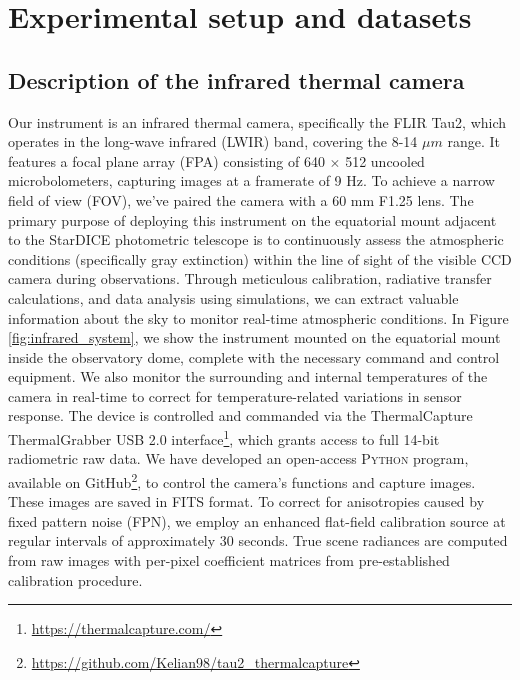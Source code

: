 \documentclass[amt, article]{copernicus}
\begin{document}
\section{Experimental setup and datasets}
\label{sec:setup}

\subsection{Description of the infrared thermal camera}

Our instrument is an infrared thermal camera, specifically the FLIR Tau2, which operates in the long-wave infrared (LWIR) band, covering the 8-14 $\mu m$ range. It features a focal plane array (FPA) consisting of 640 $\times$ 512 uncooled microbolometers, capturing images at a framerate of 9 Hz. To achieve a narrow field of view (FOV), we've paired the camera with a 60 mm F1.25 lens. The primary purpose of deploying this instrument on the equatorial mount adjacent to the StarDICE photometric telescope is to continuously assess the atmospheric conditions (specifically gray extinction) within the line of sight of the visible CCD camera during observations.
Through meticulous calibration, radiative transfer calculations, and data analysis using simulations, we can extract valuable information about the sky to monitor real-time atmospheric conditions. In Figure \ref{fig:infrared_system}, we show the instrument mounted on the equatorial mount inside the observatory dome, complete with the necessary command and control equipment. We also monitor the surrounding and internal temperatures of the camera in real-time to correct for temperature-related variations in sensor response.
The device is controlled and commanded via the ThermalCapture ThermalGrabber USB 2.0 interface\footnote{\url{https://thermalcapture.com/}}, which grants access to full 14-bit radiometric raw data. We have developed an open-access \textsc{Python} program, available on GitHub\footnote{\url{https://github.com/Kelian98/tau2_thermalcapture}}, to control the camera's functions and capture images. These images are saved in \textsc{FITS} format. To correct for anisotropies caused by fixed pattern noise (FPN), we employ an enhanced flat-field calibration source at regular intervals of approximately 30 seconds. True scene radiances are computed from raw images with per-pixel coefficient matrices from pre-established calibration procedure.
\end{document}
